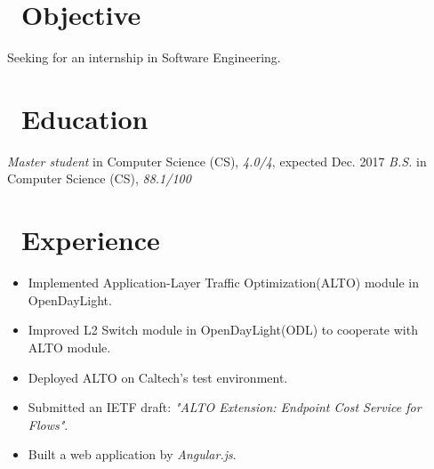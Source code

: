 \documentclass[letterpaper]{resume}
\begin{document}



\section{\faInfoCircle\ Objective}
Seeking for an internship in Software Engineering.

\section{\faGraduationCap\ Education}
\textit{Master student} in Computer Science (CS), \textit{4.0/4}, expected Dec. 2017
\textit{B.S.} in Computer Science (CS), \textit{88.1/100}

\section{\faUsers\ Experience}
\begin{itemize}
  \item Implemented Application-Layer Traffic Optimization(ALTO) module in OpenDayLight.
  \item Improved L2 Switch module in OpenDayLight(ODL) to cooperate with ALTO module.
  \item Deployed ALTO on Caltech's test environment.
  \item Submitted an IETF draft: \textit{"ALTO Extension: Endpoint Cost Service for Flows"}.
\end{itemize}

\begin{itemize}
  \item Built a web application by \textit{Angular.js}.
\end{itemize}
\end{document}
